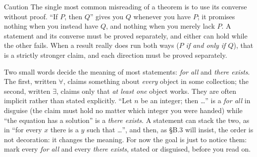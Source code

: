\documentclass[a4paper,12pt,oneside]{memoir}
\begin{document}
\begin{envcaution}{Caution}{}{}
The single most common misreading of a theorem is to use its converse without proof. “If \(P\), then \(Q\)” gives you \(Q\) whenever you have \(P\); it promises nothing when you instead have \(Q\), and nothing when you merely lack \(P\). A statement and its converse must be proved separately, and either can hold while the other fails. When a result really does run both ways (\emph{\(P\) if and only if \(Q\)}), that is a strictly stronger claim, and each direction must be proved separately.
\end{envcaution}
Two small words decide the meaning of most statements: \emph{for all} and \emph{there exists}. The first, written \(\forall\), claims something about \emph{every} object in some collection; the second, written \(\exists\), claims only that \emph{at least one} object works. They are often implicit rather than stated explicitly. “Let \(n\) be an integer; then …” is a \emph{for all} in disguise (the claim must hold no matter which integer you were handed) while “the equation has a solution” is a \emph{there exists}. A statement can stack the two, as in “for every \(x\) there is a \(y\) such that …”, and then, as §B.3 will insist, the order is not decoration: it changes the meaning. For now the goal is just to notice them: mark every \emph{for all} and every \emph{there exists}, stated or disguised, before you read on.
\end{document}
